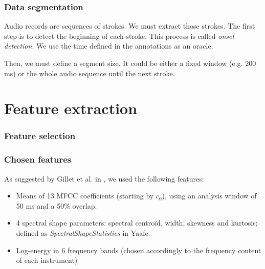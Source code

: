 \documentclass{beamer}
\begin{document}
    \begin{frame}
        \frametitle{Data segmentation}
        Audio records are sequences of strokes. We must extract those strokes. The first step is to detect the beginning of each stroke.
        This process is called \emph{onset detection}. We use the time defined in the annotations as an oracle.
        \vspace*{0.5cm}
        
        Then, we must define a segment size. It could be either a fixed window (e.g. 200 ms) or the whole audio sequence until the next stroke.
    \end{frame}
    \section{Feature extraction}
    \begin{frame}
        \frametitle{Feature selection}
    \end{frame}
    \begin{frame}
        \frametitle{Chosen features}
        As suggested by Gillet et al. in \cite{Gillet04}, we used the following features:
        \begin{itemize}
            \item Means of 13 MFCC coefficients (starting by $c_0$), using an analysis window of 50 ms and a 50\% overlap.
            \item 4 spectral shape parameters: spectral centroïd, width, skewness and kurtosis; defined as \emph{SpectralShapeStatistics} in Yaafe.
            \item Log-energy in 6 frequency bands (chosen accordingly to the frequency content of each instrument)
        \end{itemize}

    \end{frame}
\end{document}
